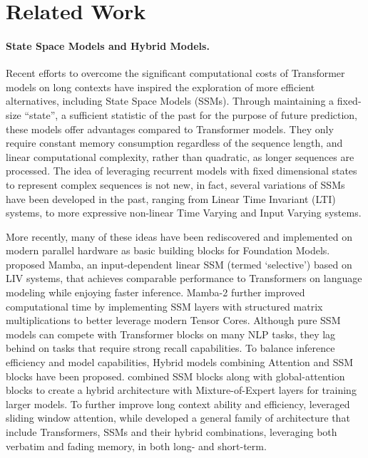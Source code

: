 \section{Related Work}
\paragraph{State Space Models and Hybrid Models.}


Recent efforts to overcome the significant computational costs of Transformer models on long contexts have inspired the exploration of more efficient alternatives, including State Space Models (SSMs). Through maintaining a fixed-size ``state'', a sufficient statistic of the past for the purpose of future prediction, these models offer advantages compared to Transformer models. They only require constant memory consumption regardless of the sequence length, and linear computational complexity, rather than quadratic, as longer sequences are processed.  
The idea of leveraging recurrent models with fixed dimensional states to represent complex sequences is not new, in fact, several variations of SSMs have been developed in the past, ranging from Linear Time Invariant (LTI) systems, to more expressive non-linear Time Varying \citep{jazwinski2007stochastic} and Input Varying \citep{krener1975bilinear} systems.

More recently, many of these ideas have been rediscovered and implemented on modern parallel hardware as basic building blocks for Foundation Models. 
\cite{gu2023mamba} proposed Mamba, an input-dependent linear SSM (termed `selective') based on LIV systems, that achieves comparable performance to Transformers \citep{vaswani2017attention} on language modeling while enjoying faster inference. 
Mamba-2 \citep{dao2024transformers} further improved computational time by implementing SSM layers with structured matrix multiplications to better leverage modern Tensor Cores.
Although pure SSM models can compete with Transformer blocks on many NLP tasks, they lag behind on tasks that require strong recall capabilities. To balance inference efficiency and model capabilities, Hybrid models combining Attention and SSM blocks have been proposed.
\cite{lieber2024jamba} combined SSM blocks along with global-attention blocks to create a hybrid architecture with Mixture-of-Expert layers for training larger models. To further improve long context ability and efficiency, \cite{ren2024samba} leveraged sliding window attention, while \cite{zancato2024b} developed a general family of architecture that include Transformers, SSMs and their hybrid combinations, leveraging both verbatim and fading memory, in both long- and short-term.
\color{black}

